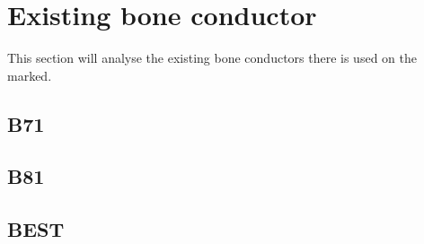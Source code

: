 \section{Existing bone conductor}
This section will analyse the existing bone conductors there is used on the marked. 

\subsection{B71}

\subsection{B81}

\subsection{BEST}